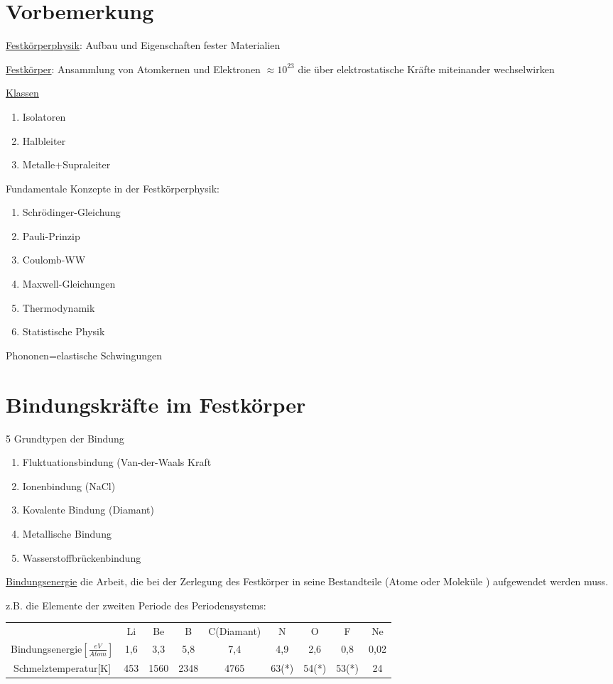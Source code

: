 \chapter*{Vorbemerkung}

\underline{Festkörperphysik}: Aufbau und Eigenschaften fester Materialien

\underline{Festkörper}: Ansammlung von Atomkernen und Elektronen \(\approx
10^{23}\) die über elektrostatische Kräfte miteinander wechselwirken

\underline{Klassen}
\begin{enumerate}
\item Isolatoren
\item Halbleiter
\item Metalle+Supraleiter
\end{enumerate}

Fundamentale Konzepte in der Festkörperphysik:

\begin{enumerate}
\item Schrödinger-Gleichung
\item Pauli-Prinzip
\item Coulomb-WW
\item Maxwell-Gleichungen
\item Thermodynamik
\item Statistische Physik
\end{enumerate}

 Phononen=elastische Schwingungen

\chapter{Bindungskräfte im Festkörper}
5 Grundtypen der Bindung
\begin{enumerate}
\item Fluktuationsbindung (Van-der-Waals Kraft
\item Ionenbindung (NaCl)
\item Kovalente Bindung (Diamant)
\item Metallische Bindung
\item Wasserstoffbrückenbindung
\end{enumerate}

\underline{Bindungsenergie} 
die Arbeit, die bei der Zerlegung des Festkörper in seine Bestandteile (Atome
oder Moleküle ) aufgewendet werden muss.

z.B. die Elemente der zweiten Periode des Periodensystems:
\begin{tabular}{ccccccccc}
&Li&Be&B&C(Diamant)&N&O&F&Ne\\
Bindungsenergie\(\left[\frac{eV}{Atom}\right]\)&1,6&3,3&5,8&7,4&4,9&2,6&0,8&0,02\\
Schmelztemperatur[K]&453&1560&2348&4765&63(*)&54(*)&53(*)&24
\end{tabular}

